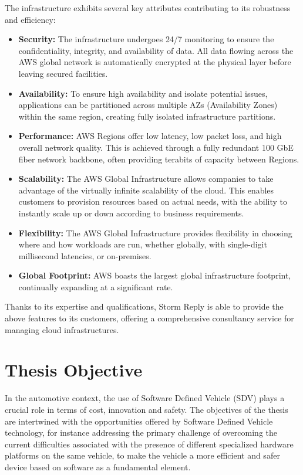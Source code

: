 The infrastructure exhibits several key attributes contributing to its robustness and efficiency: 
\begin{itemize} 
  \item \textbf{Security:} The infrastructure undergoes 24/7 monitoring to ensure the confidentiality, integrity, and availability of data. All data flowing across the AWS global network is automatically encrypted at the physical layer before leaving secured facilities.
  \item \textbf{Availability:} To ensure high availability and isolate potential issues, applications can be partitioned across multiple AZs (Availability Zones) within the same region, creating fully isolated infrastructure partitions.
  \item \textbf{Performance:} AWS Regions offer low latency, low packet loss, and high overall network quality. This is achieved through a fully redundant 100 GbE fiber network backbone, often providing terabits of capacity between Regions.
  \item \textbf{Scalability:} The AWS Global Infrastructure allows companies to take advantage of the virtually infinite scalability of the cloud. This enables customers to provision resources based on actual needs, with the ability to instantly scale up or down according to business requirements.
  \item \textbf{Flexibility:} The AWS Global Infrastructure provides flexibility in choosing where and how workloads are run, whether globally, with single-digit millisecond latencies, or on-premises.
  \item \textbf{Global Footprint:} AWS boasts the largest global infrastructure footprint, continually expanding at a significant rate.
\end{itemize}
Thanks to its expertise and qualifications, Storm Reply is able to provide the above features to its customers, offering a comprehensive consultancy service for managing cloud infrastructures.

\section{Thesis Objective}
In the automotive context, the use of Software Defined Vehicle (SDV) plays a crucial role in terms of cost, innovation and safety. The objectives of the thesis are intertwined with the opportunities offered by Software Defined Vehicle technology, for instance addressing the primary challenge of overcoming the current difficulties associated with the presence of different specialized hardware platforms on the same vehicle, to make the vehicle a more efficient and safer device based on software as a fundamental element.

